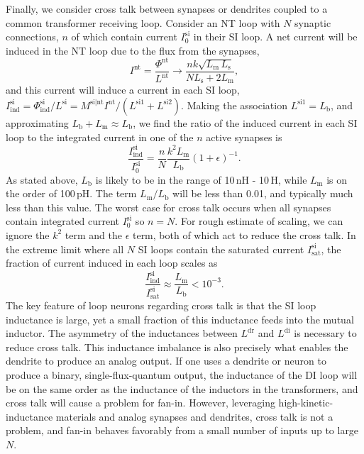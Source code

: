 \documentclass[twocolumn]{article}
\begin{document}
Finally, we consider cross talk between synapses or dendrites coupled to a common transformer receiving loop. Consider an NT loop with $N$ synaptic connections, $n$ of which contain current $I^{\mathrm{si}}_0$ in their SI loop. A net current will be induced in the NT loop due to the flux from the synapses,
\begin{equation}
\label{eq:fan-in__transformer_collection__I_nt}
I^{\mathrm{nt}} = \frac{\Phi^{\mathrm{nt}}}{L^{\mathrm{nt}}}\rightarrow \frac{ n k \sqrt{L_{\mathrm{m}}\,L_{\mathrm{s}}}}{NL_{\mathrm{s}}+2L_{\mathrm{m}}},
\end{equation}
and this current will induce a current in each SI loop, $I^{\mathrm{si}}_{\mathrm{ind}} = \Phi^{\mathrm{si}}_{\mathrm{ind}}/L^{\mathrm{si}} = M^{\mathrm{si|nt}}I^{\mathrm{nt}}/(L^{\mathrm{si1}}+L^{\mathrm{si2}})$. Making the association $L^{\mathrm{si1}} = L_{\mathrm{b}}$, and approximating $L_{\mathrm{b}} + L_{\mathrm{m}} \approx L_{\mathrm{b}}$, we find the ratio of the induced current in each SI loop to the integrated current in one of the $n$ active synapses is
\begin{equation}
\label{eq:fan-in__transformer_collection__cross_talk}
\frac{I^{\mathrm{si}}_{\mathrm{ind}}}{I^{\mathrm{si}}_0} = \frac{n}{N}\frac{k^2L_{\mathrm{m}}}{L_{\mathrm{b}}}\left( 1+\epsilon \right)^{-1}.
\end{equation}
As stated above, $L_{\mathrm{b}}$ is likely to be in the range of 10\,nH - 10\,\textmu H, while $L_{\mathrm{m}}$ is on the order of 100\,pH. The term $L_{\mathrm{m}}/L_{\mathrm{b}}$ will be less than 0.01, and typically much less than this value. The worst case for cross talk occurs when all synapses contain integrated current $I^{\mathrm{si}}_0$ so $n = N$. For rough estimate of scaling, we can ignore the $k^2$ term and the $\epsilon$ term, both of which act to reduce the cross talk. In the extreme limit where all $N$ SI loops contain the saturated current $I^{\mathrm{si}}_{\mathrm{sat}}$, the fraction of current induced in each loop scales as
\begin{equation}
\label{eq:fan-in__transformer_collection__cross_talk__worst_case}
\frac{I^{\mathrm{si}}_{\mathrm{ind}}}{I^{\mathrm{si}}_{\mathrm{sat}}} \approx \frac{L_{\mathrm{m}}}{L_{\mathrm{b}}} < 10^{-3}.
\end{equation}
The key feature of loop neurons regarding cross talk is that the SI loop inductance is large, yet a small fraction of this inductance feeds into the mutual inductor. The asymmetry of the inductances between $L^{\mathrm{dr}}$ and $L^{\mathrm{di}}$ is necessary to reduce cross talk. This inductance imbalance is also precisely what enables the dendrite to produce an analog output. If one uses a dendrite or neuron to produce a binary, single-flux-quantum output, the inductance of the DI loop will be on the same order as the inductance of the inductors in the transformers, and cross talk will cause a problem for fan-in. However, leveraging high-kinetic-inductance materials and analog synapses and dendrites, cross talk is not a problem, and fan-in behaves favorably from a small number of inputs up to large $N$.
\end{document}
